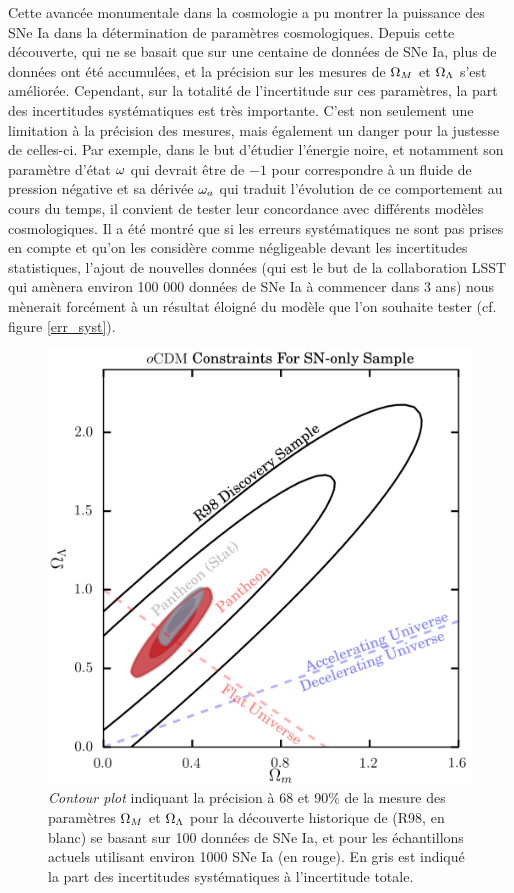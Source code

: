 \documentclass[a4paper, 12pt, svgnames]{article}
\begin{document}
Cette avancée monumentale dans la cosmologie a pu montrer la puissance des SNe
Ia dans la détermination de paramètres cosmologiques. Depuis cette découverte,
qui ne se basait que sur une centaine de données de SNe Ia, plus de données ont
été accumulées, et la précision sur les mesures de $\Omega_M$ et $\Omega_\Lambda$ s'est
améliorée. Cependant, sur la totalité de l'incertitude sur ces paramètres, la
part des incertitudes systématiques est très importante. C'est non seulement une
limitation à la précision des mesures, mais également un danger pour la justesse
de celles-ci. Par exemple, dans le but d’étudier l’énergie noire, et notamment
son paramètre d’état $\omega$ qui devrait être de $-1$ pour correspondre à un fluide
de pression négative et sa dérivée $\omega_a$ qui traduit l’évolution de ce
comportement au cours du temps, il convient de tester leur concordance avec
différents modèles cosmologiques. Il a été montré que si les erreurs
systématiques ne sont pas prises en compte et qu'on les considère comme
négligeable devant les incertitudes statistiques, l'ajout de nouvelles données
(qui est le but de la collaboration LSST qui amènera environ 100 000 données de
SNe Ia à commencer dans 3 ans) nous mènerait forcément à un résultat éloigné du
modèle que l'on souhaite tester (cf. figure \ref{err_syst}).

\begin{figure}[htbp!]
    \centering
    \includegraphics[width=.5\linewidth]{Rapport_figures/scolnic_syst.png}
    \captionsetup{justification=centering}
    \caption{\textit{Contour plot} indiquant la précision à 68 et 90\% de la
    mesure des paramètres $\Omega_M$ et $\Omega_\Lambda$ pour la découverte historique de
     (R98, en blanc) se basant sur 100 données de SNe Ia, et
    pour les échantillons actuels utilisant environ 1000 SNe Ia (en rouge). En
    gris est indiqué la part des incertitudes systématiques à l'incertitude
    totale. \cite{scolnic_complete_2018}}
    \label{scolnic_syst}
\end{figure}
\end{document}
